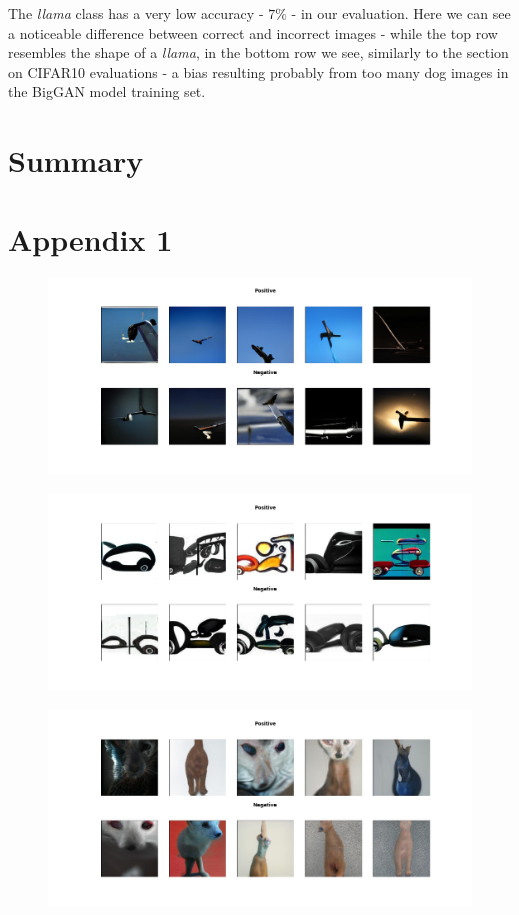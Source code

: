 \documentclass[12pt,a4paper,openany]{book}
\begin{document}
\newline
\noindent The \textit{llama} class has a very low accuracy - $7\%$ - in our evaluation. Here we can see a noticeable difference between correct and incorrect images - while the top row resembles the shape of a \textit{llama}, in the bottom row we see, similarly to the section on CIFAR10 evaluations - a bias resulting probably from too many dog images in the BigGAN model training set.

\chapter{Summary}
\chapter{Appendix 1}
\begin{figure}[h!]
    \centering
    \includegraphics[scale=0.4]{figs/cifar10_examples/airplane.png}
\end{figure}
\begin{figure}[h!]
    \centering
    \includegraphics[scale=0.4]{figs/cifar10_examples/automobile.png}
\end{figure}
\begin{figure}[h!]
    \centering
    \includegraphics[scale=0.4]{figs/cifar10_examples/cat.png}
\end{figure}
\end{document}
